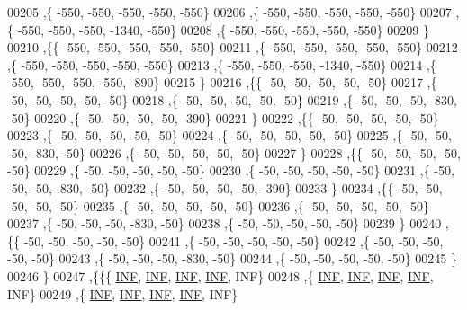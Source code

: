 \begin{DoxyCode}
00205   ,\{  -550,  -550,  -550,  -550,  -550\}
00206   ,\{  -550,  -550,  -550,  -550,  -550\}
00207   ,\{  -550,  -550,  -550, -1340,  -550\}
00208   ,\{  -550,  -550,  -550,  -550,  -550\}
00209   \}
00210  ,\{\{  -550,  -550,  -550,  -550,  -550\}
00211   ,\{  -550,  -550,  -550,  -550,  -550\}
00212   ,\{  -550,  -550,  -550,  -550,  -550\}
00213   ,\{  -550,  -550,  -550, -1340,  -550\}
00214   ,\{  -550,  -550,  -550,  -550,  -890\}
00215   \}
00216  ,\{\{   -50,   -50,   -50,   -50,   -50\}
00217   ,\{   -50,   -50,   -50,   -50,   -50\}
00218   ,\{   -50,   -50,   -50,   -50,   -50\}
00219   ,\{   -50,   -50,   -50,  -830,   -50\}
00220   ,\{   -50,   -50,   -50,   -50,  -390\}
00221   \}
00222  ,\{\{   -50,   -50,   -50,   -50,   -50\}
00223   ,\{   -50,   -50,   -50,   -50,   -50\}
00224   ,\{   -50,   -50,   -50,   -50,   -50\}
00225   ,\{   -50,   -50,   -50,  -830,   -50\}
00226   ,\{   -50,   -50,   -50,   -50,   -50\}
00227   \}
00228  ,\{\{   -50,   -50,   -50,   -50,   -50\}
00229   ,\{   -50,   -50,   -50,   -50,   -50\}
00230   ,\{   -50,   -50,   -50,   -50,   -50\}
00231   ,\{   -50,   -50,   -50,  -830,   -50\}
00232   ,\{   -50,   -50,   -50,   -50,  -390\}
00233   \}
00234  ,\{\{   -50,   -50,   -50,   -50,   -50\}
00235   ,\{   -50,   -50,   -50,   -50,   -50\}
00236   ,\{   -50,   -50,   -50,   -50,   -50\}
00237   ,\{   -50,   -50,   -50,  -830,   -50\}
00238   ,\{   -50,   -50,   -50,   -50,   -50\}
00239   \}
00240  ,\{\{   -50,   -50,   -50,   -50,   -50\}
00241   ,\{   -50,   -50,   -50,   -50,   -50\}
00242   ,\{   -50,   -50,   -50,   -50,   -50\}
00243   ,\{   -50,   -50,   -50,  -830,   -50\}
00244   ,\{   -50,   -50,   -50,   -50,   -50\}
00245   \}
00246  \}
00247 ,\{\{\{   \hyperlink{energy__const_8h_a12c2040f25d8e3a7b9e1c2024c618cb6}{INF},   \hyperlink{energy__const_8h_a12c2040f25d8e3a7b9e1c2024c618cb6}{INF},   \hyperlink{energy__const_8h_a12c2040f25d8e3a7b9e1c2024c618cb6}{INF},   \hyperlink{energy__const_8h_a12c2040f25d8e3a7b9e1c2024c618cb6}{INF},   INF\}
00248   ,\{   \hyperlink{energy__const_8h_a12c2040f25d8e3a7b9e1c2024c618cb6}{INF},   \hyperlink{energy__const_8h_a12c2040f25d8e3a7b9e1c2024c618cb6}{INF},   \hyperlink{energy__const_8h_a12c2040f25d8e3a7b9e1c2024c618cb6}{INF},   \hyperlink{energy__const_8h_a12c2040f25d8e3a7b9e1c2024c618cb6}{INF},   INF\}
00249   ,\{   \hyperlink{energy__const_8h_a12c2040f25d8e3a7b9e1c2024c618cb6}{INF},   \hyperlink{energy__const_8h_a12c2040f25d8e3a7b9e1c2024c618cb6}{INF},   \hyperlink{energy__const_8h_a12c2040f25d8e3a7b9e1c2024c618cb6}{INF},   \hyperlink{energy__const_8h_a12c2040f25d8e3a7b9e1c2024c618cb6}{INF},   INF\}

\end{DoxyCode}
